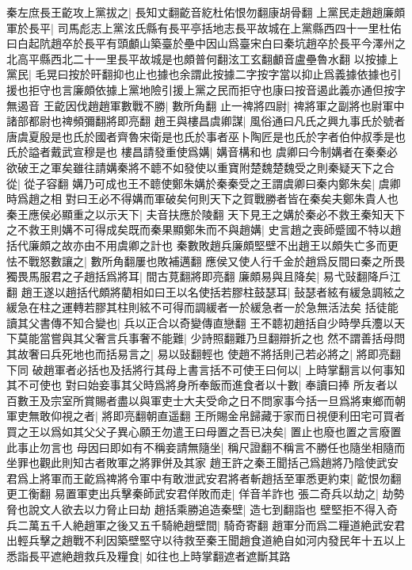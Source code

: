 秦左庶長王齕攻上黨拔之|{
	長知丈翻齕音紇杜佑恨勿翻康胡骨翻}
上黨民走趙趙廉頗軍於長平|{
	司馬彪志上黨泫氏縣有長平亭括地志長平故城在上黨縣西四十一里杜佑曰白起阬趙卒於長平有頭顱山築臺於壘中因山爲臺宋白曰秦坑趙卒於長平今澤州之北高平縣西北二十一里長平故城是也頗普何翻泫工玄翻顱音盧壘魯水翻}
以按據上黨民|{
	毛晃曰按於旰翻抑也止也據也余謂此按據二字按字當以抑止爲義據依據也引援也拒守也言廉頗依據上黨地險引援上黨之民而拒守也康曰按音遏此義亦通但按字無遏音}
王齕因伐趙趙軍數戰不勝|{
	數所角翻}
止一禆將四尉|{
	禆將軍之副將也尉軍中諸部都尉也禆頻彌翻將即亮翻}
趙王與樓昌虞卿謀|{
	風俗通曰凡氏之興九事氏於號者唐虞夏殷是也氏於國者齊魯宋衛是也氏於事者巫卜陶匠是也氏於字者伯仲叔季是也氏於謚者戴武宣穆是也}
樓昌請發重使爲媾|{
	媾音構和也}
虞卿曰今制媾者在秦秦必欲破王之軍矣雖往請媾秦將不聼不如發使以重寶附楚魏楚魏受之則秦疑天下之合從|{
	從子容翻}
媾乃可成也王不聼使鄭朱媾於秦秦受之王謂虞卿曰秦内鄭朱矣|{
	虞卿時爲趙之相}
對曰王必不得媾而軍破矣何則天下之賀戰勝者皆在秦矣夫鄭朱貴人也秦王應侯必顯重之以示天下|{
	夫音扶應於陵翻}
天下見王之媾於秦必不救王秦知天下之不救王則媾不可得成矣既而秦果顯鄭朱而不與趙媾|{
	史言趙之喪師蹙國不特以趙括代廉頗之故亦由不用虞卿之計也}
秦數敗趙兵廉頗堅壁不出趙王以頗失亡多而更怯不戰怒數讓之|{
	數所角翻屢也敗補邁翻}
應侯又使人行千金於趙爲反間曰秦之所畏獨畏馬服君之子趙括爲將耳|{
	間古莧翻將即亮翻}
廉頗易與且降矣|{
	易弋䜴翻降戶江翻}
趙王遂以趙括代頗將藺相如曰王以名使括若膠柱鼓瑟耳|{
	鼔瑟者絃有緩急調絃之緩急在柱之運轉若膠其柱則絃不可得而調緩者一於緩急者一於急無活法矣}
括徒能讀其父書傳不知合變也|{
	兵以正合以奇變傳直戀翻}
王不聼初趙括自少時學兵灋以天下莫能當嘗與其父奢言兵事奢不能難|{
	少詩照翻難乃旦翻辯折之也}
然不謂善括母問其故奢曰兵死地也而括易言之|{
	易以䜴翻輕也}
使趙不將括則己若必將之|{
	將即亮翻下同}
破趙軍者必括也及括將行其母上書言括不可使王曰何以|{
	上時掌翻言以何事知其不可使也}
對曰始妾事其父時爲將身所奉飯而進食者以十數|{
	奉讀曰捧}
所友者以百數王及宗室所賞賜者盡以與軍吏士大夫受命之日不問家事今括一旦爲將東鄉而朝軍吏無敢仰視之者|{
	將即亮翻朝直遥翻}
王所賜金帛歸藏于家而日視便利田宅可買者買之王以爲如其父父子異心願王勿遣王曰母置之吾已决矣|{
	置止也廢也置之言廢置此事止勿言也}
母因曰即如有不稱妾請無隨坐|{
	稱尺證翻不稱言不勝任也隨坐相隨而坐罪也觀此則知古者敗軍之將罪併及其家}
趙王許之秦王聞括己爲趙將乃陰使武安君爲上將軍而王齕爲禆將令軍中有敢泄武安君將者斬趙括至軍悉更約束|{
	齕恨勿翻更工衡翻}
易置軍吏出兵擊秦師武安君佯敗而走|{
	佯音羊詐也}
張二奇兵以劫之|{
	劫勢脅也說文人欲去以力脅止曰劫}
趙括乘勝追造秦壁|{
	造七到翻詣也}
壁堅拒不得入奇兵二萬五千人絶趙軍之後又五千騎絶趙壁間|{
	騎奇寄翻}
趙軍分而爲二糧道絶武安君出輕兵擊之趙戰不利因築壁堅守以待救至秦王聞趙食道絶自如河内發民年十五以上悉詣長平遮絶趙救兵及糧食|{
	如往也上時掌翻遮者遮斷其路}
